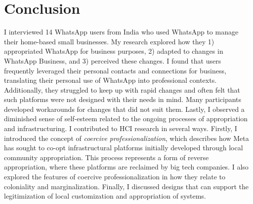 \section{Conclusion}

I interviewed 14 WhatsApp users from India who used WhatsApp to manage their home-based small businesses. My research explored how they 1) appropriated WhatsApp for business purposes, 2) adapted to changes in WhatsApp Business, and 3) perceived these changes. I found that users frequently leveraged their personal contacts and connections for business, translating their personal use of WhatsApp into professional contexts. Additionally, they struggled to keep up with rapid changes and often felt that such platforms were not designed with their needs in mind. Many participants developed workarounds for changes that did not suit them. Lastly, I observed a diminished sense of self-esteem related to the ongoing processes of appropriation and infrastructuring. I contributed to HCI research in several ways. Firstly, I introduced the concept of \textit{coercive professionalization}, which describes how Meta has sought to co-opt infrastructural platforms initially developed through local community appropriation. This process represents a form of reverse appropriation, where these platforms are reclaimed by big tech companies. I also explored the features of coercive professionalization in how they relate to coloniality and marginalization. Finally, I discussed designs that can support the legitimization of local customization and appropriation of systems.




















